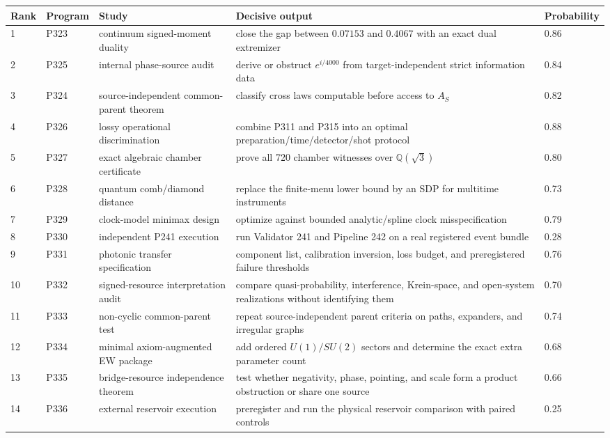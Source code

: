 \documentclass[11pt,a4paper,openany]{report}
\begin{document}
\begin{center}
\begingroup\fontsize{7}{8.4}\selectfont
\setlength{\tabcolsep}{2.5pt}
\renewcommand{\arraystretch}{1.16}
\begin{longtable}{@{}p{}p{}p{}p{}p{}@{}}
\toprule
\textbf{Rank} & \textbf{Program} & \textbf{Study} & \textbf{Decisive output} & \textbf{Probability} \\
\midrule
\endhead
1 & P323 & continuum signed-moment duality & close the gap between \(0.07153\) and \(0.4067\) with an exact dual extremizer & 0.86 \\
2 & P325 & internal phase-source audit & derive or obstruct \(e^{i/4000}\) from target-independent strict information data & 0.84 \\
3 & P324 & source-independent common-parent theorem & classify cross laws computable before access to \(A_S\) & 0.82 \\
4 & P326 & lossy operational discrimination & combine P311 and P315 into an optimal preparation/\allowbreak{}time/\allowbreak{}detector/\allowbreak{}shot protocol & 0.88 \\
5 & P327 & exact algebraic chamber certificate & prove all 720 chamber witnesses over \(\mathbb Q(\sqrt3)\) & 0.80 \\
6 & P328 & quantum comb/\allowbreak{}diamond distance & replace the finite-menu lower bound by an SDP for multitime instruments & 0.73 \\
7 & P329 & clock-model minimax design & optimize against bounded analytic/\allowbreak{}spline clock misspecification & 0.79 \\
8 & P330 & independent P241 execution & run Validator 241 and Pipeline 242 on a real registered event bundle & 0.28 \\
9 & P331 & photonic transfer specification & component list, calibration inversion, loss budget, and preregistered failure thresholds & 0.76 \\
10 & P332 & signed-resource interpretation audit & compare quasi-probability, interference, Krein-space, and open-system realizations without identifying them & 0.70 \\
11 & P333 & non-cyclic common-parent test & repeat source-independent parent criteria on paths, expanders, and irregular graphs & 0.74 \\
12 & P334 & minimal axiom-augmented EW package & add ordered \(U(1)/SU(2)\) sectors and determine the exact extra parameter count & 0.68 \\
13 & P335 & bridge-resource independence theorem & test whether negativity, phase, pointing, and scale form a product obstruction or share one source & 0.66 \\
14 & P336 & external reservoir execution & preregister and run the physical reservoir comparison with paired controls & 0.25 \\
\bottomrule
\end{longtable}
\endgroup
\end{center}
\end{document}
